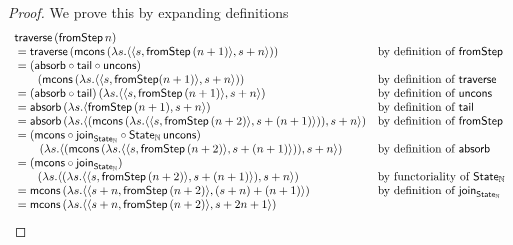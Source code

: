 \begin{proof}
We prove this by expanding definitions
$$
\begin{array}{ll}
\mathsf{traverse}\, (\mathsf{fromStep}\, n) \\
{}= \mathsf{traverse}\, (\mathsf{mcons}\, (\lambda s. \langle \langle s, \mathsf{fromStep}\, (n + 1) \rangle, s + n \rangle))
	& \mbox{by definition of }\mathsf{fromStep} \\
{}= (\mathsf{absorb} \circ \mathsf{tail} \circ \mathsf{uncons})\, \\\qquad (\mathsf{mcons}\, (\lambda s. \langle \langle s, \mathsf{fromStep} (n + 1) \rangle, s + n \rangle))
	& \mbox{by definition of }\mathsf{traverse} \\
{}= (\mathsf{absorb} \circ \mathsf{tail})\, (\lambda s. \langle \langle s, \mathsf{fromStep}\, (n + 1) \rangle, s + n \rangle)
	& \mbox{by definition of }\mathsf{uncons} \\
{}= \mathsf{absorb}\, (\lambda s. \langle \mathsf{fromStep}\, (n + 1), s + n \rangle)
	& \mbox{by definition of }\mathsf{tail} \\
{}= \mathsf{absorb}\, (\lambda s. \langle (\mathsf{mcons}\, (\lambda s. \langle \langle s, \mathsf{fromStep}\, (n + 2) \rangle, s + (n + 1) \rangle)), s + n \rangle)
	& \mbox{by definition of }\mathsf{fromStep} \\
{}= (\mathsf{mcons} \circ \mathsf{join}_{\mathsf{State}_{\mathbb{N}}} \circ \mathsf{State}_{\mathbb{N}}\,\mathsf{uncons}) \\\qquad \, (\lambda s. \langle (\mathsf{mcons}\, (\lambda s. \langle \langle s, \mathsf{fromStep}\, (n + 2) \rangle, s + (n + 1) \rangle)), s + n \rangle)
	& \mbox{by definition of }\mathsf{absorb} \\
{}= (\mathsf{mcons} \circ \mathsf{join}_{\mathsf{State}_{\mathbb{N}}})\, \\\qquad (\lambda s. \langle (\lambda s. \langle \langle s, \mathsf{fromStep}\, (n + 2) \rangle, s + (n + 1) \rangle), s + n \rangle)
	& \mbox{by functoriality of }\mathsf{State}_{\mathbb{N}} \\
{}= \mathsf{mcons}\, (\lambda s. \langle \langle s + n, \mathsf{fromStep}\,(n + 2) \rangle, (s + n) + (n + 1) \rangle)
	& \mbox{by definition of } \mathsf{join}_{\mathsf{State}_{\mathbb{N}}} \\
{}= \mathsf{mcons}\, (\lambda s. \langle \langle s + n, \mathsf{fromStep}\,(n + 2) \rangle, s + 2n + 1 \rangle)
\end{array}
$$
\end{proof}

